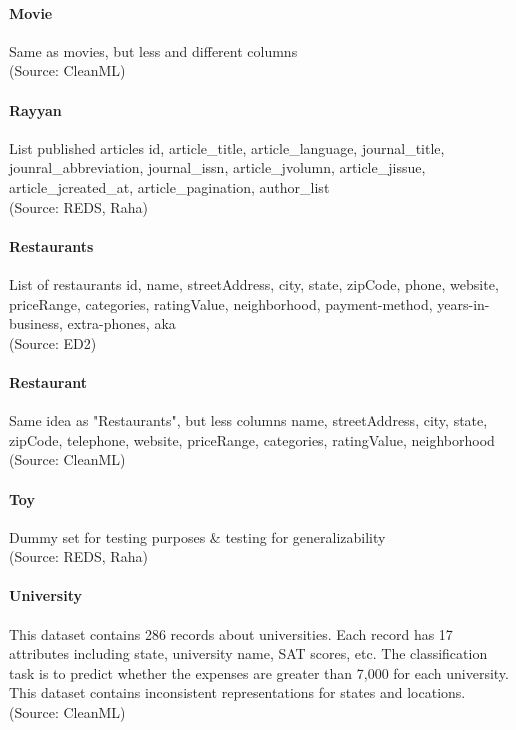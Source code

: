 \paragraph{Movie}
Same as movies, but less and different columns
\\(Source: CleanML)

\paragraph{Rayyan}
List published articles
id, article\_title, article\_language, journal\_title, jounral\_abbreviation, journal\_issn, article\_jvolumn, article\_jissue, article\_jcreated\_at, article\_pagination, author\_list
\\(Source: REDS, Raha)

\paragraph{Restaurants}
List of restaurants
id, name, streetAddress, city, state, zipCode, phone, website, priceRange, categories, ratingValue, neighborhood, payment-method, years-in-business, extra-phones, aka
\\(Source: ED2)

\paragraph{Restaurant}
Same idea as "Restaurants", but less columns
name, streetAddress, city, state, zipCode, telephone, website, priceRange, categories, ratingValue, neighborhood
\\(Source: CleanML)

\paragraph{Toy}
Dummy set for testing purposes \& testing for generalizability
\\(Source: REDS, Raha)

\paragraph{University}
This dataset contains 286 records about universities. Each record has 17 attributes including state, university name,
SAT scores, etc. The classification task is to predict whether the expenses are greater than 7,000 for each university. This dataset contains inconsistent representations for states and locations.
\\(Source: CleanML)

